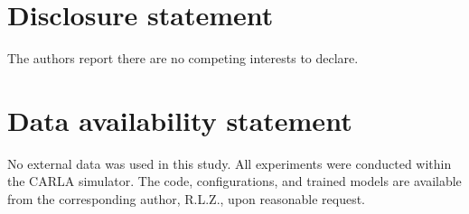 \documentclass[]{interact}
\begin{document}
\section*{Disclosure statement}
The authors report there are no competing interests to declare.

\section*{Data availability statement}
No external data was used in this study. All experiments were conducted within the CARLA simulator. The code, configurations, and trained models are available from the corresponding author, R.L.Z., upon reasonable request.



\end{document}
